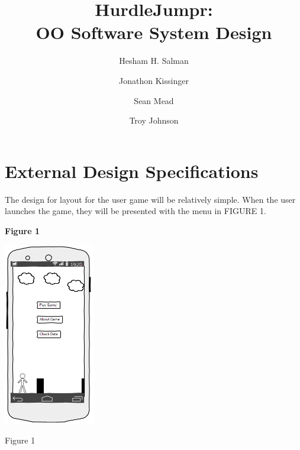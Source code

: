 \documentclass[a4wide]{article}
\title{HurdleJumpr:\\ OO Software System Design}
\author{Hesham H. Salman \and Jonathon Kissinger \and Sean Mead \and Troy Johnson}
\begin{document}
\maketitle

\section{External Design Specifications}
The design for layout for the user game will be relatively simple. When the user launches the game, they will be presented with the menu in FIGURE 1.
\begin{figure 1}
    \centering
    \textbf{Figure 1}\par\medskip
    \includegraphics[height=8cm]{images/intro.png}
    \caption{Figure 1}
\end{figure 1}
\end{document}
